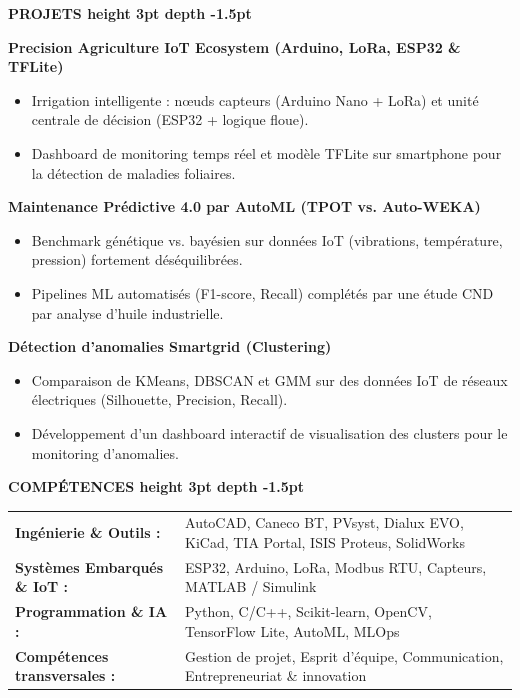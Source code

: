\documentclass[10pt,a4paper]{altacv}
\renewcommand{\cvsection}[2][]{%
  \vspace{4pt}%
  {\color{heading}\Large\bfseries #2 \hspace{0.2em}\leaders\vrule height 3pt depth -1.5pt\hfill\mbox{}}\par\vspace{3pt}
}
\begin{document}
\cvsection{PROJETS}
{\normalsize\bfseries\color{accent} Precision Agriculture IoT Ecosystem (Arduino, LoRa, ESP32 \& TFLite)}\par\vspace{1.5pt}
\begin{itemize}[leftmargin=*, label=\textbullet, nosep, itemsep=1.5pt]
  \item Irrigation intelligente : nœuds capteurs (Arduino Nano + LoRa) et unité centrale de décision (ESP32 + logique floue).
  \item Dashboard de monitoring temps réel et modèle TFLite sur smartphone pour la détection de maladies foliaires.
\end{itemize}
\vspace{2pt}
{\normalsize\bfseries\color{accent} Maintenance Prédictive 4.0 par AutoML (TPOT vs. Auto-WEKA)}\par\vspace{1.5pt}
\begin{itemize}[leftmargin=*, label=\textbullet, nosep, itemsep=1.5pt]
  \item Benchmark génétique vs. bayésien sur données IoT (vibrations, température, pression) fortement déséquilibrées.
  \item Pipelines ML automatisés (F1-score, Recall) complétés par une étude CND par analyse d’huile industrielle.
\end{itemize}
\vspace{2pt}
{\normalsize\bfseries\color{accent} Détection d’anomalies Smartgrid (Clustering)}\par\vspace{1.5pt}
\begin{itemize}[leftmargin=*, label=\textbullet, nosep, itemsep=1.5pt]
  \item Comparaison de KMeans, DBSCAN et GMM sur des données IoT de réseaux électriques (Silhouette, Precision, Recall).
  \item Développement d’un dashboard interactif de visualisation des clusters pour le monitoring d’anomalies.
\end{itemize}

\cvsection{COMPÉTENCES}
\begin{tabular}{@{}ll@{}}
\textbf{Ingénierie \& Outils :} & AutoCAD, Caneco BT, PVsyst, Dialux EVO, KiCad, TIA Portal, ISIS Proteus, SolidWorks \\[1.5pt]
\textbf{Systèmes Embarqués \& IoT :} & ESP32, Arduino, LoRa, Modbus RTU, Capteurs, MATLAB / Simulink \\[1.5pt]
\textbf{Programmation \& IA :} & Python, C/C++, Scikit-learn, OpenCV, TensorFlow Lite, AutoML, MLOps \\[1.5pt]
\textbf{Compétences transversales :} & Gestion de projet, Esprit d'équipe, Communication, Entrepreneuriat \& innovation
\end{tabular}
\end{document}
